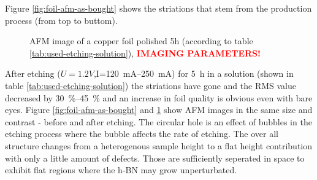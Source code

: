 Figure \ref{fig:foil-afm-as-bought} shows the striations that stem from the production process (from top to buttom).
\begin{figure}[] \centering
	\caption{AFM image of a copper foil polished 5h (according to table \ref{tab:used-etching-solution}), \textcolor{red}{\textbf{IMAGING PARAMETERS!}}}
	\label{fig:foil-afm-polished}
\end{figure}

After etching ($U=1.2V$,I=\SIrange{120}{250}{\mA}) for \SI{5}{\hour} in a solution (shown in table \ref{tab:used-etching-solution}) the striations have gone and the RMS value decreased by \SIrange{30}{45}{\percent} and an increase in foil quality is obvious even with bare eyes. Figure \ref{fig:foil-afm-as-bought} and \ref{fig:foil-afm-polished} show AFM images in the same size and contrast - before and after etching.
The circular hole is an effect of bubbles in the etching process where the bubble affects the rate of etching. The over all structure changes from a heterogenous sample height to a flat height contribution with only a little amount of defects. Those are sufficiently seperated in space to exhibit flat regions where the h-BN may grow unperturbated.

